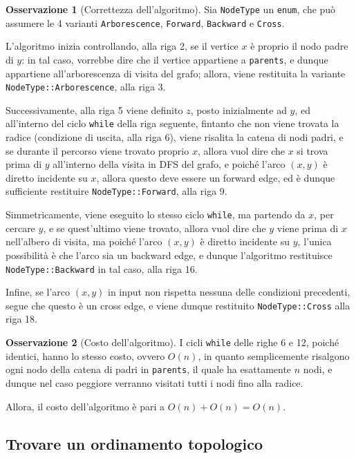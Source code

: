 \documentclass[14pt]{extreport}
\theoremstyle{definition}
\theoremstyle{definition}
\newtheorem{remark}{Osservazione}[subsection]
\begin{document}
\begin{remark}[Correttezza dell'algoritmo]
    Sia \texttt{NodeType} un \texttt{enum}, che può assumere le 4 varianti \texttt{Arborescence}, \texttt{Forward}, \texttt{Backward} e \texttt{Cross}.

    L'algoritmo inizia controllando, alla riga 2, se il vertice $x$ è proprio il nodo padre di $y$: in tal caso, vorrebbe dire che il vertice appartiene a \texttt{parents}, e dunque appartiene all'arborescenza di visita del grafo; allora, viene restituita la variante \texttt{NodeType::Arborescence}, alla riga 3.

    Successivamente, alla riga 5 viene definito $z$, posto inizialmente ad $y$, ed all'interno del ciclo \texttt{while} della riga seguente, fintanto che non viene trovata la radice (condizione di uscita, alla riga 6), viene risalita la catena di nodi padri, e se durante il percorso viene trovato proprio $x$, allora vuol dire che $x$ si trova prima di $y$ all'interno della visita in DFS del grafo, e poiché l'arco $(x, y)$ è diretto incidente su $x$, allora questo deve essere un forward edge, ed è dunque sufficiente restituire \texttt{NodeType::Forward}, alla riga 9.

    Simmetricamente, viene eseguito lo stesso ciclo \texttt{while}, ma partendo da $x$, per cercare $y$, e se quest'ultimo viene trovato, allora vuol dire che $y$ viene prima di $x$ nell'albero di visita, ma poiché l'arco $(x, y)$ è diretto incidente su $y$, l'unica possibilità è che l'arco sia un backward edge, e dunque l'algoritmo restituisce \texttt{NodeType::Backward} in tal caso, alla riga 16.

    Infine, se l'arco $(x, y)$ in input non rispetta nessuna delle condizioni precedenti, segue che questo è un cross edge, e viene dunque restituito \texttt{NodeType::Cross} alla riga 18.
\end{remark}

\begin{remark}[Costo dell'algoritmo]
    I cicli \texttt{while} delle righe 6 e 12, poiché identici, hanno lo stesso costo, ovvero $O(n)$, in quanto semplicemente risalgono ogni nodo della catena di padri in \texttt{parents}, il quale ha esattamente $n$ nodi, e dunque nel caso peggiore verranno visitati tutti i nodi fino alla radice.

    Allora, il costo dell'algoritmo è pari a $O(n) + O(n) = O(n)$.
\end{remark}

\subsection{Trovare un ordinamento topologico}
\end{document}
